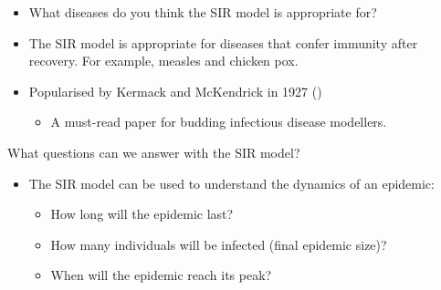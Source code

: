 \documentclass[
  ignorenonframetext,
]{beamer}
\providecommand{\tightlist}{%
  \setlength{\itemsep}{0pt}\setlength{\parskip}{0pt}}\usepackage{longtable,booktabs,array}
\begin{document}
\begin{frame}
\begin{tcolorbox}[enhanced jigsaw, colframe=quarto-callout-caution-color-frame, toprule=.15mm, opacitybacktitle=0.6, breakable, colback=white, leftrule=.75mm, left=2mm, opacityback=0, titlerule=0mm, bottomtitle=1mm, toptitle=1mm, title={Discussion}, bottomrule=.15mm, arc=.35mm, coltitle=black, colbacktitle=quarto-callout-caution-color!10!white, rightrule=.15mm]

\begin{itemize}
\tightlist
\item
  What diseases do you think the SIR model is appropriate for?
\end{itemize}

\end{tcolorbox}
\end{frame}

\begin{frame}
\begin{itemize}
\tightlist
\item
  The SIR model is appropriate for diseases that confer immunity after
  recovery. For example, measles and chicken pox.
\item
  Popularised by Kermack and McKendrick in 1927
  ()

  \begin{itemize}
  \tightlist
  \item
    A must-read paper for budding infectious disease modellers.
  \end{itemize}
\end{itemize}
\end{frame}

\begin{frame}
\begin{block}{What questions can we answer with the SIR model?}
\label{what-questions-can-we-answer-with-the-sir-model}
\begin{itemize}
\tightlist
\item
  The SIR model can be used to understand the dynamics of an epidemic:

  \begin{itemize}
  \tightlist
  \item
    How long will the epidemic last?
  \item
    How many individuals will be infected (final epidemic size)?
  \item
    When will the epidemic reach its peak?
  \end{itemize}
\end{itemize}
\end{block}
\end{frame}
\end{document}
